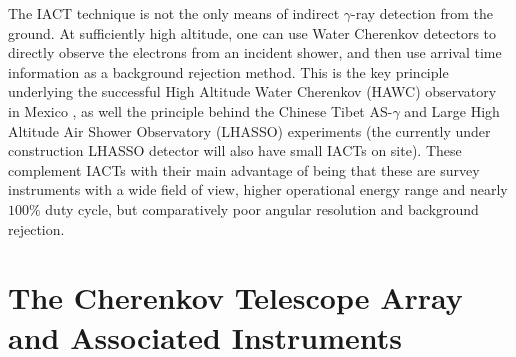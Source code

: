 The IACT technique is not the only means of indirect $\gamma$-ray detection from the ground. At sufficiently high altitude, one can use Water Cherenkov detectors to directly observe the electrons from an incident shower, and then use arrival time information as a background rejection method. This is the key principle underlying the successful High Altitude Water Cherenkov (HAWC) observatory in Mexico \cite{hawc}, as well the principle behind the Chinese Tibet AS-$\gamma$ \cite{asgamma} and Large High Altitude Air Shower Observatory (LHASSO) \cite{lhassocrab} experiments (the currently under construction LHASSO detector will also have small IACTs on site). These complement IACTs with their main advantage of being that these are survey instruments with a wide field of view, higher operational energy range and nearly $100\%$ duty cycle, but comparatively poor angular resolution and background rejection. 

\section{The Cherenkov Telescope Array and Associated Instruments}
